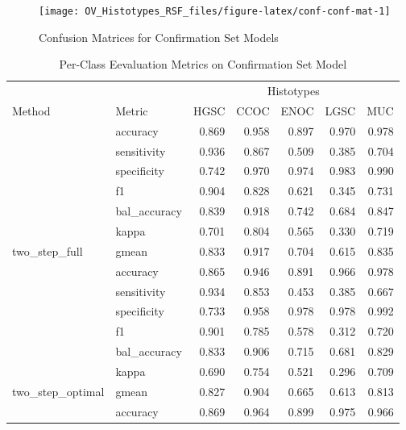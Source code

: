 \documentclass[
]{report}
\begin{document}
\begin{figure}[H]

{\centering \texttt{[image: OV\_Histotypes\_RSF\_files/figure-latex/conf-conf-mat-1]} 

}

\caption{Confusion Matrices for Confirmation Set Models}\label{fig:conf-conf-mat}
\end{figure}

\begin{table}

\caption{\label{tab:conf-eval-per-class}Per-Class Eevaluation Metrics on Confirmation Set Model}
\centering
\begin{tabular}[t]{l|l|r|r|r|r|r}
\hline
\multicolumn{2}{c|}{ } & \multicolumn{5}{c}{Histotypes} \\
\cline{3-7}
Method & Metric & HGSC & CCOC & ENOC & LGSC & MUC\\
\hline
 & accuracy & 0.869 & 0.958 & 0.897 & 0.970 & 0.978\\
\cline{2-7}
 & sensitivity & 0.936 & 0.867 & 0.509 & 0.385 & 0.704\\
\cline{2-7}
 & specificity & 0.742 & 0.970 & 0.974 & 0.983 & 0.990\\
\cline{2-7}
 & f1 & 0.904 & 0.828 & 0.621 & 0.345 & 0.731\\
\cline{2-7}
 & bal\_accuracy & 0.839 & 0.918 & 0.742 & 0.684 & 0.847\\
\cline{2-7}
 & kappa & 0.701 & 0.804 & 0.565 & 0.330 & 0.719\\
\cline{2-7}
\multirow{-7}{*}{\raggedright\arraybackslash two\_step\_full} & gmean & 0.833 & 0.917 & 0.704 & 0.615 & 0.835\\
\cline{1-7}
 & accuracy & 0.865 & 0.946 & 0.891 & 0.966 & 0.978\\
\cline{2-7}
 & sensitivity & 0.934 & 0.853 & 0.453 & 0.385 & 0.667\\
\cline{2-7}
 & specificity & 0.733 & 0.958 & 0.978 & 0.978 & 0.992\\
\cline{2-7}
 & f1 & 0.901 & 0.785 & 0.578 & 0.312 & 0.720\\
\cline{2-7}
 & bal\_accuracy & 0.833 & 0.906 & 0.715 & 0.681 & 0.829\\
\cline{2-7}
 & kappa & 0.690 & 0.754 & 0.521 & 0.296 & 0.709\\
\cline{2-7}
\multirow{-7}{*}{\raggedright\arraybackslash two\_step\_optimal} & gmean & 0.827 & 0.904 & 0.665 & 0.613 & 0.813\\
\cline{1-7}
 & accuracy & 0.869 & 0.964 & 0.899 & 0.975 & 0.966\\

\end{tabular}
\end{table}
\end{document}
